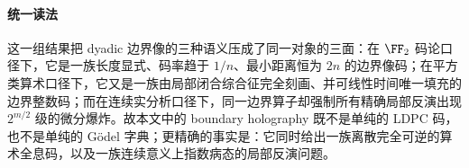 \paragraph{统一读法}
这一组结果把 dyadic 边界像的三种语义压成了同一对象的三面：在 \(\FF_2\) 码论口径下，它是一族长度显式、码率趋于 \(1/n\)、最小距离恒为 \(2n\) 的边界像码；在平方类算术口径下，它又是一族由局部闭合综合征完全刻画、并可线性时间唯一填充的边界整数码；而在连续实分析口径下，同一边界算子却强制所有精确局部反演出现 \(2^{m/2}\) 级的微分爆炸。故本文中的 boundary holography 既不是单纯的 LDPC 码，也不是单纯的 Gödel 字典；更精确的事实是：它同时给出一族离散完全可逆的算术全息码，以及一族连续意义上指数病态的局部反演问题。

\endinput
